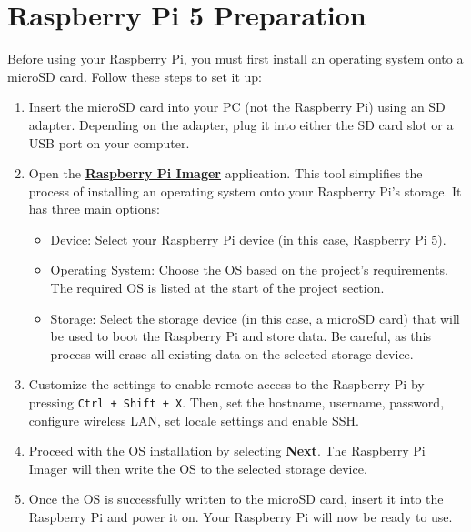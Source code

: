 \section*{ Raspberry Pi 5 Preparation}

Before using your Raspberry Pi, you must first install an operating system onto a microSD card. Follow these steps to set it up:
\begin{enumerate}
\item Insert the microSD card into your PC (not the Raspberry Pi) using an SD adapter. Depending on the adapter, plug it into either the SD card slot or a USB port on your computer.
\item Open the \href{https://www.raspberrypi.com/software}{\textbf{\color{blue}Raspberry Pi Imager}} application. This tool simplifies the process of installing an operating system onto your Raspberry Pi’s storage. It has three main options:
\begin{itemize}
\item Device: Select your Raspberry Pi device (in this case, Raspberry Pi 5).
\item Operating System: Choose the OS based on the project’s requirements. The required OS is listed at the start of the project section.
\item Storage: Select the storage device (in this case, a microSD card) that will be used to boot the Raspberry Pi and store data. Be careful, as this process will erase all existing data on the selected storage device.
\end{itemize}
\item Customize the settings to enable remote access to the Raspberry Pi by pressing \texttt{Ctrl + Shift + X}. Then, set the hostname, username, password, configure wireless LAN, set locale settings and enable SSH.
\item Proceed with the OS installation by selecting \textbf{Next}. The Raspberry Pi Imager will then write the OS to the selected storage device.
\item Once the OS is successfully written to the microSD card, insert it into the Raspberry Pi and power it on. Your Raspberry Pi will now be ready to use.
\end{enumerate}

